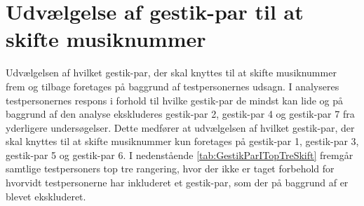 \section{Udvælgelse af gestik-par til at skifte musiknummer}
\label{TestresultaterSkiftMusiknummer}
%
Udvælgelsen af hvilket gestik-par, der skal knyttes til at skifte musiknummer frem og tilbage foretages på baggrund af testpersonernes udsagn. I  analyseres testpersonernes respons i forhold til hvilke gestik-par de mindst kan lide og på baggrund af den analyse ekskluderes gestik-par 2, gestik-par 4 og gestik-par 7 fra yderligere undersøgelser. Dette medfører at udvælgelsen af hvilket gestik-par, der skal knyttes til at skifte musiknummer kun foretages på gestik-par 1, gestik-par 3, gestik-par 5 og gestik-par 6.\blankline
%  
I nedenstående \autoref{tab:GestikParITopTreSkift} fremgår samtlige testpersoners top tre rangering, hvor der ikke er taget forbehold for hvorvidt testpersonerne har inkluderet et gestik-par, som der på baggrund af  er blevet ekskluderet.
%
